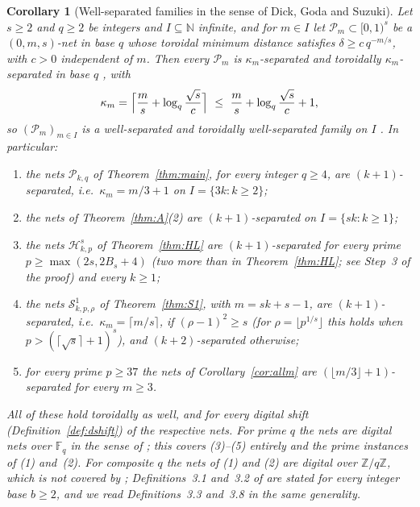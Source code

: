 \documentclass[11pt]{amsart}
\newtheorem{corollary}[theorem]{Corollary}
\theoremstyle{definition}
\theoremstyle{plain}
\newcommand{\Z}{\mathbb{Z}}
\newcommand{\F}{\mathbb{F}}
\providecommand{\N}{\mathbb{N}}
\begin{document}
\begin{corollary}[Well-separated families in the sense of Dick, Goda and Suzuki]\label{cor:dgs}
Let $s\ge2$ and $q\ge2$ be integers and $I\subseteq\N$ infinite, and for $m\in I$ let $\mathcal P_m\subset[0,1)^s$ be a $(0,m,s)$-net in base $q$ whose toroidal minimum distance satisfies $\delta\ge c\,q^{-m/s}$, with $c>0$ independent of $m$. Then every $\mathcal P_m$ is $\kappa_m$-separated and toroidally $\kappa_m$-separated in base $q$ \cite[Def.~3.3]{DGS2}, with
\[
\kappa_m=\Bigl\lceil\frac ms+\log_q\frac{\sqrt s}{c}\Bigr\rceil\ \le\ \frac ms+\log_q\frac{\sqrt s}{c}+1,
\]
so $(\mathcal P_m)_{m\in I}$ is a well-separated and toroidally well-separated family on $I$ \cite[Def.~3.8]{DGS2}. In particular:
\begin{enumerate}
\item the nets $\mathcal P_{k,q}$ of Theorem~\ref{thm:main}, for every integer $q\ge4$, are $(k+1)$-separated, i.e.\ $\kappa_m=m/3+1$ on $I=\{3k:k\ge2\}$;
\item the nets of Theorem~\ref{thm:A}(2) are $(k+1)$-separated on $I=\{sk:k\ge1\}$;
\item the nets $\mathcal H^s_{k,p}$ of Theorem~\ref{thm:HL} are $(k+1)$-separated for every prime $p\ge\max(2s,2B_s+4)$ (two more than in Theorem~\ref{thm:HL}; see Step~3 of the proof) and every $k\ge1$;
\item the nets $\mathcal S^1_{k,p,\rho}$ of Theorem~\ref{thm:S1}, with $m=sk+s-1$, are $(k+1)$-separated, i.e.\ $\kappa_m=\lceil m/s\rceil$, if $(\rho-1)^2\ge s$ (for $\rho=\lfloor p^{1/s}\rfloor$ this holds when $p>(\lceil\sqrt s\rceil+1)^s$), and $(k+2)$-separated otherwise;
\item for every prime $p\ge37$ the nets of Corollary~\ref{cor:allm} are $(\lfloor m/3\rfloor+1)$-separated for every $m\ge3$.
\end{enumerate}
All of these hold toroidally as well, and for every digital shift (Definition~\ref{def:dshift}) of the respective nets. For prime $q$ the nets are digital nets over $\F_q$ in the sense of \cite[Def.~2.1]{DGS2}; this covers (3)--(5) entirely and the prime instances of (1) and~(2). For composite $q$ the nets of (1) and (2) are digital over $\Z/q\Z$, which is not covered by \cite[Def.~2.1]{DGS2}; Definitions~3.1 and~3.2 of \cite{DGS2} are stated for every integer base $b\ge2$, and we read Definitions~3.3 and~3.8 in the same generality.
\end{corollary}
\end{document}
